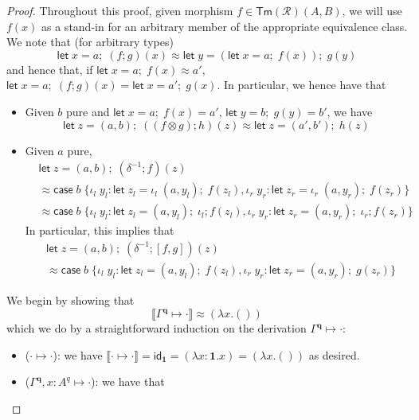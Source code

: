 \documentclass[acmsmall,screen,anonymous,review]{acmart}
\newcommand{\mc}[1]{\ensuremath{\mathcal{#1}}}
\newcommand{\mb}[1]{\ensuremath{\mathbf{#1}}}
\newcommand{\ms}[1]{\ensuremath{\mathsf{#1}}}
\newcommand{\lto}{:}
\newcommand{\linl}[1]{\iota_l\;{#1}}
\newcommand{\linr}[1]{\iota_r\;{#1}}
\newcommand{\letexpr}[3]{\ensuremath{\ms{let}\;#1 = #2;\;#3}}
\newcommand{\caseexpr}[5]{\ms{case}\;#1\;\{\linl{#2} \lto #3, \linr{#4} \lto #5\}}
\newcommand{\cwk}[2]{#1 \mapsto #2}
\newcommand{\dnt}[1]{\llbracket{#1}\rrbracket}
\begin{document}
\begin{proof}
  Throughout this proof, given morphism $f \in \ms{Tm}(\mc{R})(A, B)$, we will use $f(x)$ as a
  stand-in for an arbitrary member of the appropriate equivalence class. We note that (for arbitrary
  types)
  \begin{equation*}
  \letexpr{x}{a}{(f ; g)(x)} \approx \letexpr{y}{(\letexpr{x}{a}{f(x)})}{g(y)}
  \end{equation*}
  and hence that, if $\letexpr{x}{a}{f(x)} \approx a'$, $\letexpr{x}{a}{(f ; g)(x)} =
  \letexpr{x}{a'}{g(x)}$. In particular, we hence have that 
  \begin{itemize}
    \item Given $b$ pure and $\letexpr{x}{a}{f(x)} = a'$,
    $\letexpr{y}{b}{g(y)} = b'$, we have
    \begin{equation*}
      \letexpr{z}{(a, b)}{((f \otimes g) ; h)(z)} \approx \letexpr{z}{(a', b')}{h(z)}
    \end{equation*}
    \item Given $a$ pure,
    \begin{align*} 
    &\letexpr{z}{(a, b)}{(\delta^{-1} ; f)(z)} 
    \\ &\approx \caseexpr{b}
      {y_l}{\letexpr{z_l}{\linl{(a, y_l)}}{f(z_l)}}
      {y_r}{\letexpr{z_r}{\linr{(a, y_r)}}{f(z_r)}}
    \\ &\approx \caseexpr{b}
      {y_l}{\letexpr{z_l}{(a, y_l)}{\iota_l ; f(z_l)}}
      {y_r}{\letexpr{z_r}{(a, y_r)}{\iota_r ; f(z_r)}}
    \end{align*}
    In particular, this implies that
    \begin{align*} 
    &\letexpr{z}{(a, b)}{(\delta^{-1} ; [f, g])(z)} 
    \\ &\approx \caseexpr{b}
      {y_l}{\letexpr{z_l}{(a, y_l)}{f(z_l)}}
      {y_r}{\letexpr{z_r}{(a, y_r)}{g(z_r)}}
    \end{align*}
  \end{itemize} 
  We begin by showing that
  \begin{equation*}
    \dnt{\cwk{\Gamma^{\mb{q}}}{\cdot}} \approx (\lambda x. ())
  \end{equation*}
  which we do by a straightforward induction on the derivation $\cwk{\Gamma^{\mb{q}}}{\cdot}$:
  \begin{itemize}
    \item ($\cwk{\cdot}{\cdot}$): we have $\dnt{\cwk{\cdot}{\cdot}} = \ms{id}_{\mb{1}} = (\lambda x
    : \mb{1}.x) = (\lambda x.())$ as desired.
    \item ($\cwk{\Gamma^{\mb{q}}, x : A^q}{\cdot}$): we have that

\end{itemize}
\end{proof}
\end{document}
